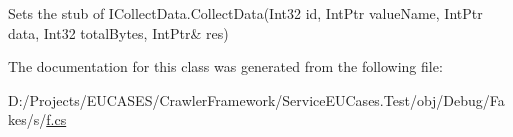 Sets the stub of I\-Collect\-Data.\-Collect\-Data(Int32 id, Int\-Ptr value\-Name, Int\-Ptr data, Int32 total\-Bytes, Int\-Ptr\& res)



The documentation for this class was generated from the following file\-:\begin{DoxyCompactItemize}
\item 
D\-:/\-Projects/\-E\-U\-C\-A\-S\-E\-S/\-Crawler\-Framework/\-Service\-E\-U\-Cases.\-Test/obj/\-Debug/\-Fakes/s/\hyperlink{s_2f_8cs}{f.\-cs}\end{DoxyCompactItemize}
